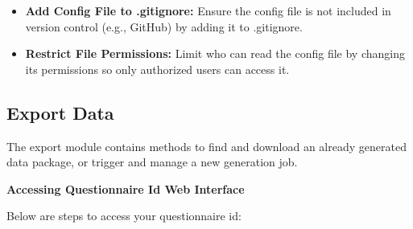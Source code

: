 \documentclass[
  letterpaper,
  DIV=11,
  numbers=noendperiod]{scrreprt}
\begin{document}
\begin{itemize}
\item
  \textbf{Add Config File to .gitignore:} Ensure the config file is not
  included in version control (e.g., GitHub) by adding it to .gitignore.
\item
  \textbf{Restrict File Permissions:} Limit who can read the config file
  by changing its permissions so only authorized users can access it.
\end{itemize}

\subsection{Export Data}\label{export-data}

The export module contains methods to find and download an already
generated data package, or trigger and manage a new generation job.

\textbf{Accessing Questionnaire Id Web Interface}

Below are steps to access your questionnaire id:
\end{document}
